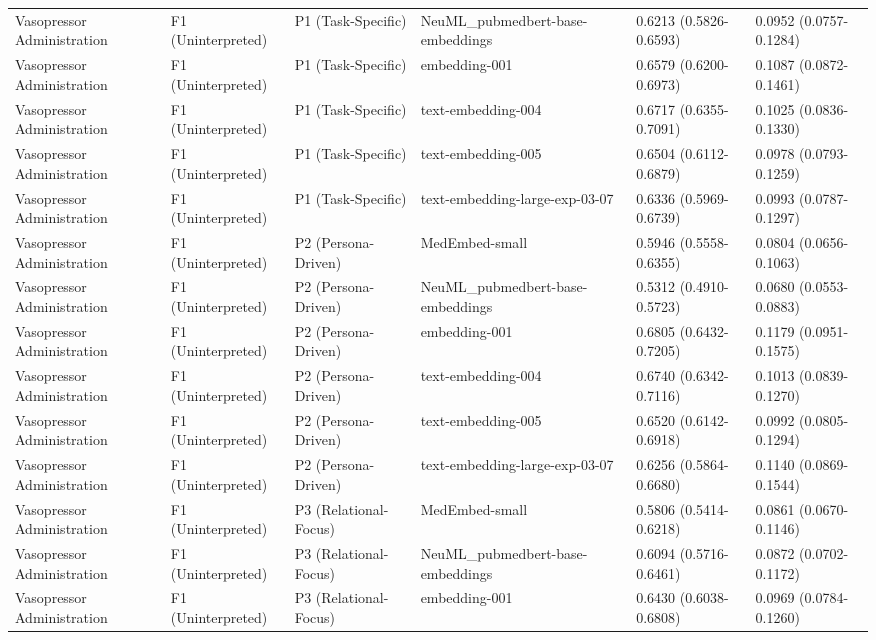 \begin{tabular}{llllll}
Vasopressor Administration & F1 (Uninterpreted) & P1 (Task-Specific) & NeuML\_pubmedbert-base-embeddings & 0.6213 (0.5826-0.6593) & 0.0952 (0.0757-0.1284) \\
Vasopressor Administration & F1 (Uninterpreted) & P1 (Task-Specific) & embedding-001 & 0.6579 (0.6200-0.6973) & 0.1087 (0.0872-0.1461) \\
Vasopressor Administration & F1 (Uninterpreted) & P1 (Task-Specific) & text-embedding-004 & 0.6717 (0.6355-0.7091) & 0.1025 (0.0836-0.1330) \\
Vasopressor Administration & F1 (Uninterpreted) & P1 (Task-Specific) & text-embedding-005 & 0.6504 (0.6112-0.6879) & 0.0978 (0.0793-0.1259) \\
Vasopressor Administration & F1 (Uninterpreted) & P1 (Task-Specific) & text-embedding-large-exp-03-07 & 0.6336 (0.5969-0.6739) & 0.0993 (0.0787-0.1297) \\
Vasopressor Administration & F1 (Uninterpreted) & P2 (Persona-Driven) & MedEmbed-small & 0.5946 (0.5558-0.6355) & 0.0804 (0.0656-0.1063) \\
Vasopressor Administration & F1 (Uninterpreted) & P2 (Persona-Driven) & NeuML\_pubmedbert-base-embeddings & 0.5312 (0.4910-0.5723) & 0.0680 (0.0553-0.0883) \\
Vasopressor Administration & F1 (Uninterpreted) & P2 (Persona-Driven) & embedding-001 & 0.6805 (0.6432-0.7205) & 0.1179 (0.0951-0.1575) \\
Vasopressor Administration & F1 (Uninterpreted) & P2 (Persona-Driven) & text-embedding-004 & 0.6740 (0.6342-0.7116) & 0.1013 (0.0839-0.1270) \\
Vasopressor Administration & F1 (Uninterpreted) & P2 (Persona-Driven) & text-embedding-005 & 0.6520 (0.6142-0.6918) & 0.0992 (0.0805-0.1294) \\
Vasopressor Administration & F1 (Uninterpreted) & P2 (Persona-Driven) & text-embedding-large-exp-03-07 & 0.6256 (0.5864-0.6680) & 0.1140 (0.0869-0.1544) \\
Vasopressor Administration & F1 (Uninterpreted) & P3 (Relational-Focus) & MedEmbed-small & 0.5806 (0.5414-0.6218) & 0.0861 (0.0670-0.1146) \\
Vasopressor Administration & F1 (Uninterpreted) & P3 (Relational-Focus) & NeuML\_pubmedbert-base-embeddings & 0.6094 (0.5716-0.6461) & 0.0872 (0.0702-0.1172) \\
Vasopressor Administration & F1 (Uninterpreted) & P3 (Relational-Focus) & embedding-001 & 0.6430 (0.6038-0.6808) & 0.0969 (0.0784-0.1260) \\

\end{tabular}
